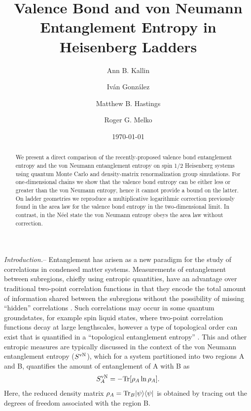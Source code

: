 \documentclass[prl,aps,twocolumn,floatfix,amsmath,amssymb,superscriptaddress,tightenlines]{revtex4}
\begin{document}
\date{\today}
\title{Valence Bond and von Neumann Entanglement Entropy in Heisenberg Ladders}
\author{Ann B. Kallin}

\author{Iv\'an Gonz\'alez}

\author{Matthew B. Hastings}

\author{Roger G. Melko}

\begin{abstract} We present a direct comparison of the recently-proposed
valence bond entanglement entropy and the von Neumann entanglement entropy on
spin 1/2 Heisenberg systems using quantum Monte Carlo and density-matrix
renormalization group simulations.  For one-dimensional chains we
show that the valence bond entropy can be either less or greater than the
von Neumann entropy, hence it cannot provide a bound on the latter.  On
ladder geometries we reproduce a multiplicative logarithmic correction
previously found in the area law for the valence bond entropy in the
two-dimensional limit.  In contrast, in the N\'eel state the von Neumann entropy
obeys the area law without correction.

\end{abstract}
\maketitle


{\it Introduction.}-- Entanglement has arisen 
as a new paradigm for the study of correlations in condensed matter systems.  
Measurements
of entanglement between subregions, chiefly using entropic
quantities, have an advantage over traditional two-point correlation
functions in that they encode the total amount of information shared
between the subregions without the possibility of missing ``hidden''
correlations \cite{wolf}.  
Such correlations may occur in some quantum groundstates,  for example spin liquid states, 
where two-point correlation functions decay at large lengthscales, however a type of topological order can exist that is quantified in a ``topological entanglement
entropy''  \cite{ KP}.
This and other entropic measures are typically discussed in the context of
the von Neumann entanglement entropy ($S^{\rm vN}$), which for a system partitioned into
two regions A and B, quantifies the amount of entanglement of A with B as
\begin{equation} 
S^{\rm vN}_A = - {\rm Tr} [ \rho_A \ln \rho_A ]. \label{vNEE} 
\end{equation}
Here, the reduced density matrix $\rho_A = {\rm Tr}_B | \psi \rangle
\langle \psi |$ is obtained by tracing out the degrees of freedom
associated with the region B.
\end{document}
